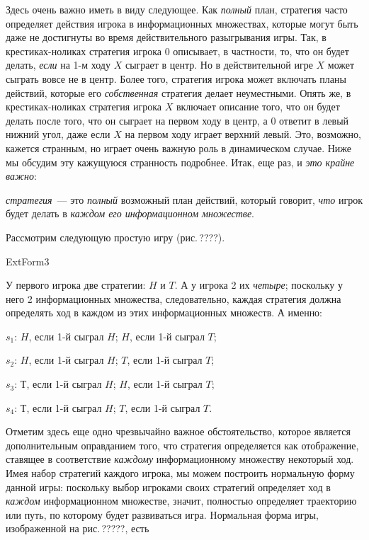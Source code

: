 \documentclass[12pt]{article}
\begin{document}
Здесь очень важно иметь в виду следующее. Как {\it полный} план,
стратегия часто определяет действия игрока в информационных
множествах, которые могут быть даже не достигнуты во время
действительного разыгрывания игры. Так, в крестиках-ноликах
стратегия игрока $0$ описывает, в частности, то, что он будет
делать, \emph{если} на 1-м ходу $X$ сыграет в центр. Но в
действительной игре $X$ может сыграть вовсе не в центр.  Более
того, стратегия игрока может включать планы действий, которые его
{\it собственная} стратегия делает неуместными. Опять же, в
крестиках-ноликах стратегия игрока $X$ включает описание того, что
он будет делать после того, что он сыграет на первом ходу в центр,
а $0$ ответит в левый нижний угол, даже если $X$ на первом ходу
играет верхний левый. Это, возможно, кажется странным, но играет
очень важную роль в динамическом случае. Ниже мы обсудим эту
кажущуюся странность подробнее. Итак, еще раз, и \emph{это крайне
важно}:

{\it стратегия}~--- это {\it полный} возможный план действий,
который говорит, \emph{что} игрок будет делать в {\it каждом его
информационном множестве}.

Рассмотрим следующую простую игру (рис.\,????).


ExtForm3



У первого игрока две стратегии: $H$ и $T$. А у игрока 2 их {\it
четыре}; поскольку у него 2 информационных множества, следовательно,
каждая стратегия должна определять ход в каждом из этих
информационных множеств. А именно:

$s_1$: $H$, если 1-й сыграл $H$; $H$, если 1-й сыграл $T$;

$s_2$: $H$, если 1-й сыграл $H$; $T$, если 1-й сыграл $T$;

$s_3$: $Т$, если 1-й сыграл $H$; $H$, если 1-й сыграл $T$;

$s_4$: $Т$, если 1-й сыграл $H$; $T$, если 1-й сыграл $T$.

Отметим здесь еще одно чрезвычайно важное обстоятельство, которое
является дополнительным оправданием того, что стратегия
определяется как отображение, ставящее в соответствие
\emph{каждому} информационному множеству некоторый ход. Имея набор
стратегий каждого игрока, мы можем построить нормальную форму
данной игры: поскольку выбор игроками своих стратегий определяет
ход в {\it каждом} информационном множестве, значит, полностью
определяет траекторию или путь, по которому будет развиваться
игра. Hормальная форма игры, изображенной на рис.\,?????, есть
\end{document}
